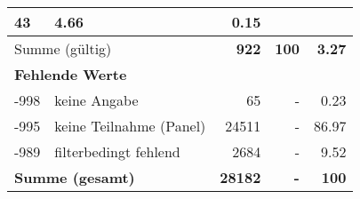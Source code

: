 \begin{longtable}{lXrrr}
       \num{43} &
       \num[round-mode=places,round-precision=2]{4.66} &
         \num[round-mode=places,round-precision=2]{0.15} \\
     \midrule
     \multicolumn{2}{l}{Summe (gültig)} &
       \textbf{\num{922}} &
     \textbf{100} &
       \textbf{\num[round-mode=places,round-precision=2]{3.27}} \\
     \multicolumn{5}{l}{\textbf{Fehlende Werte}}\\
       -998 &
       keine Angabe &
         \num{65} &
        - &
         \num[round-mode=places,round-precision=2]{0.23} \\
       -995 &
       keine Teilnahme (Panel) &
         \num{24511} &
        - &
         \num[round-mode=places,round-precision=2]{86.97} \\
       -989 &
       filterbedingt fehlend &
         \num{2684} &
        - &
         \num[round-mode=places,round-precision=2]{9.52} \\
     \midrule
     \multicolumn{2}{l}{\textbf{Summe (gesamt)}} &
          \textbf{\num{28182}} &
        \textbf{-} &
        \textbf{100} \\
     \bottomrule
     \end{longtable}
     
